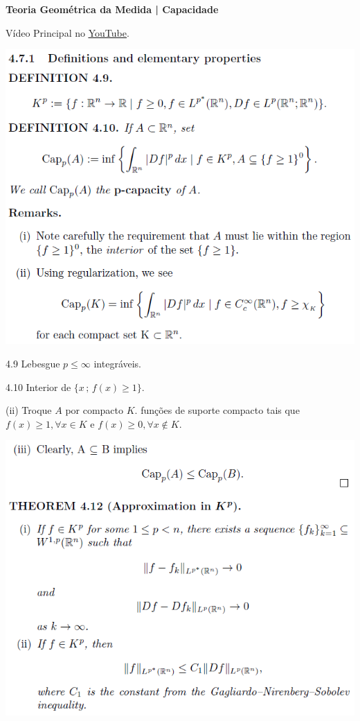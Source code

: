 \documentclass[12pt]{article}
\begin{document}
\Large

\begin{center}
\textbf{Teoria Geom\'etrica da Medida | Capacidade}
\end{center}

\large

V\'ideo Principal no \href{https://www.youtube.com/watch?v=mmzqmIcX7xo}{\color{blue}\underline{YouTube}}.

\vspace{3mm}

		\begin{center}
		\includegraphics[scale=.9]{1}
		\end{center}

4.9 Lebesgue $p \le \infty$ integr\'aveis.

4.10 Interior de $\{ x\,;\,f(x) \ge 1 \}$.

(ii) Troque $A$ por compacto $K$. fun\c{c}\~oes de suporte compacto tais que $f(x) \ge 1, \forall x \in K$ e $f(x) \ge 0, \forall x \notin K$.

\vspace{300mm}

		\begin{center}
		\includegraphics{2}
		\end{center}
\end{document}
